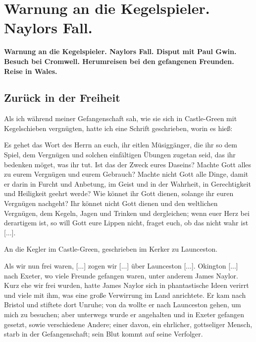 
\chapter[Warnung an die Kegelspieler. Naylors Fall.]{Warnung an die Kegelspieler. Naylors Fall.}

\begin{center}
\textbf{Warnung an die Kegelspieler. Naylors Fall. Disput mit Paul
Gwin. Besuch bei Cromwell. Herumreisen bei den gefangenen
Freunden. Reise in Wales.}
\end{center}

\section{Zurück in der Freiheit}

Als ich während meiner Gefangenschaft sah, wie sie sich in
Castle-Green mit Kegelschieben 
vergnügten, hatte ich eine Schrift geschrieben, worin es hieß:

{
    Es gehet das Wort des Herrn an euch, ihr eitlen Müsiggänger, 
    die ihr so dem Spiel, dem Vergnügen und solchen 
    einfältigen Übungen zugetan seid, das ihr bedenken möget, was ihr
    tut. Ist das der Zweck eures Daseins? Machte Gott alles zu
    eurem Vergnügen und eurem Gebrauch? Machte nicht Gott alle
    Dinge, damit er darin in Furcht und Anbetung, im Geist und in
    der Wahrheit, in Gerechtigkeit und Heiligkeit geehrt werde? Wie
    könnet ihr Gott dienen, solange ihr euren 
    Vergnügen nachgeht?
    Ihr könnet nicht Gott dienen und den weltlichen Vergnügen, dem
    Kegeln, Jagen und Trinken und dergleichen; wenn euer Herz bei
    derartigem ist, so will Gott eure Lippen nicht, fraget euch, ob das
    nicht wahr ist [...]. 

    \bigskip
    An die Kegler im Castle-Green, geschrieben 
    im Kerker zu Launceston.
}

Als wir nun frei waren, [...] zogen wir [...] über Launceston 
[...]. Okington [...] nach Exeter, wo viele Freunde 
gefangen waren, unter anderem James 
Naylor. 
Kurz ehe wir frei wurden, hatte James Naylor sich in phantastische 
Ideen verirrt und viele mit ihm, was eine große Verwirrung im Land
anrichtete. Er kam nach Bristol und stiftete dort Unruhe; von
da wollte er nach Launceston gehen, um mich zu besuchen; aber
unterwegs wurde er angehalten und in Exeter gefangen gesetzt,
sowie verschiedene Andere; einer davon, ein ehrlicher, gottseliger
Mensch, starb in der Gefangenschaft; sein Blut kommt auf seine
Verfolger.

